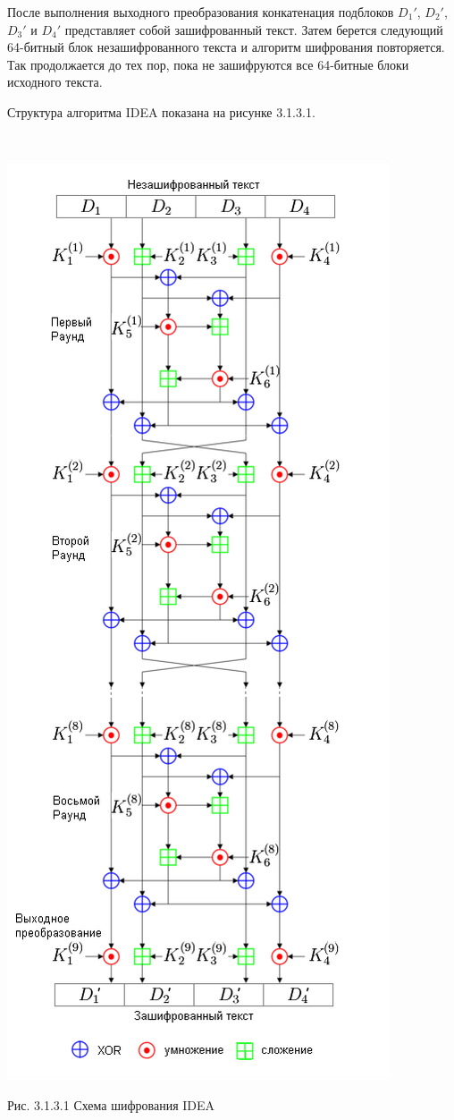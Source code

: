 \documentclass[a4paper]{report}
\begin{document}
После выполнения выходного преобразования конкатенация подблоков $D_{1}'$, $D_{2}'$, $D_{3}'$ и $D_{4}'$ представляет собой зашифрованный текст. Затем берется следующий 64-битный блок незашифрованного текста и алгоритм шифрования повторяется. Так продолжается до тех пор, пока не зашифруются все 64-битные блоки исходного текста.

Структура алгоритма IDEA показана на рисунке 3.1.3.1.

~

\includegraphics[scale=0.7]{IDEA_encryption}
{\centering\caption{\newline Рис. 3.1.3.1 Схема шифрования IDEA}\\}
\end{document}
